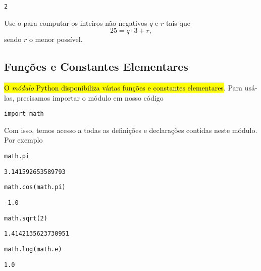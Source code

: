 \documentclass[a4paper,10pt,twoside]{article}
\begin{document}
\begin{verbatim}
2
\end{verbatim}

\begin{exr}
  Use o {\python} para computar os inteiros não negativos $q$ e $r$ tais que
  \begin{equation}
    25 = q\cdot 3 + r,
  \end{equation}
  sendo $r$ o menor possível.
\end{exr}

\subsection{Funções e Constantes Elementares}

\hl{O \emph{módulo} Python {\PYTHONmath} disponibiliza várias funções e constantes elementares}. Para usá-las, precisamos importar o módulo em nosso código

\begin{lstlisting}
import math
\end{lstlisting}

Com isso, temos acesso a todas as definições e declarações contidas neste módulo. Por exemplo

\begin{lstlisting}
math.pi
\end{lstlisting}

\begin{verbatim}
3.141592653589793
\end{verbatim}

\begin{lstlisting}
math.cos(math.pi)
\end{lstlisting}

\begin{verbatim}
-1.0
\end{verbatim}

\begin{lstlisting}
math.sqrt(2)
\end{lstlisting}

\begin{verbatim}
1.4142135623730951
\end{verbatim}

\begin{lstlisting}
math.log(math.e)
\end{lstlisting}

\begin{verbatim}
1.0
\end{verbatim}
\end{document}
